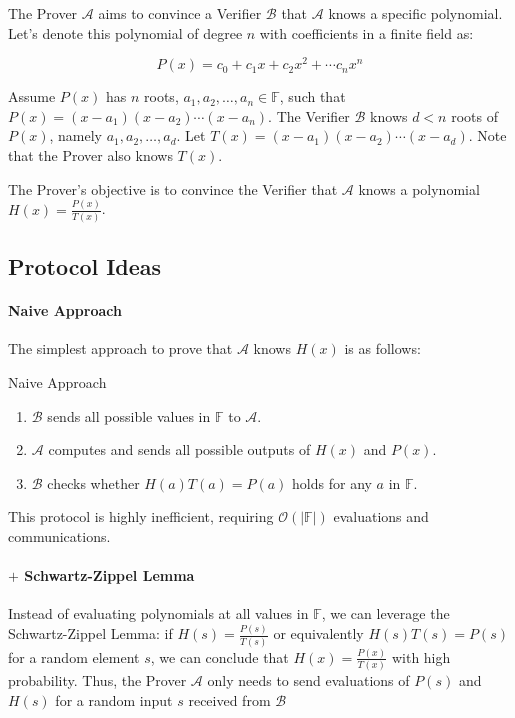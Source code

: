 \documentclass{article}
\begin{document}
The Prover $\mathcal{A}$ aims to convince a Verifier $\mathcal{B}$ that $\mathcal{A}$ knows a specific polynomial. Let's denote this polynomial of degree $n$ with coefficients in a finite field as:

\begin{equation}
    P(x) = c_0 + c_1 x + c_2 x^{2} + \cdots c_n x^{n}
\end{equation}

Assume $P(x)$ has $n$ roots, $a_1, a_2, \ldots, a_n \in \mathbb{F}$, such that $P(x) = (x - a_1)(x - a_2)\cdots(x - a_n)$. The Verifier $\mathcal{B}$ knows $d < n$ roots of $P(x)$, namely $a_1, a_2, \ldots, a_d$. Let $T(x) = (x - a_1)(x - a_2)\cdots(x - a_d)$. Note that the Prover also knows $T(x)$.

The Prover's objective is to convince the Verifier that $\mathcal{A}$ knows a polynomial $H(x) = \frac{P(x)}{T(x)}$.

\subsection{Protocol Ideas}

\paragraph{Naive Approach}

The simplest approach to prove that $\mathcal{A}$ knows $H(x)$ is as follows:

\begin{protocol}{Naive Approach}{}
\begin{enumerate}
    \item $\mathcal{B}$ sends all possible values in $\mathbb{F}$ to $\mathcal{A}$.
    \item $\mathcal{A}$ computes and sends all possible outputs of $H(x)$ and $P(x)$.
    \item $\mathcal{B}$ checks whether $H(a)T(a) = P(a)$ holds for any $a$ in $\mathbb{F}$.
\end{enumerate}
\end{protocol}

This protocol is highly inefficient, requiring $\mathcal{O}(|\mathbb{F}|)$ evaluations and communications.

\paragraph{$+$ Schwartz-Zippel Lemma}

Instead of evaluating polynomials at all values in $\mathbb{F}$, we can leverage the Schwartz-Zippel Lemma: if $H(s) = \frac{P(s)}{T(s)}$ or equivalently $H(s)T(s) = P(s)$ for a random element $s$, we can conclude that $H(x) = \frac{P(x)}{T(x)}$ with high probability. Thus, the Prover $\mathcal{A}$ only needs to send evaluations of $P(s)$ and $H(s)$ for a random input $s$ received from $\mathcal{B}$
\end{document}
